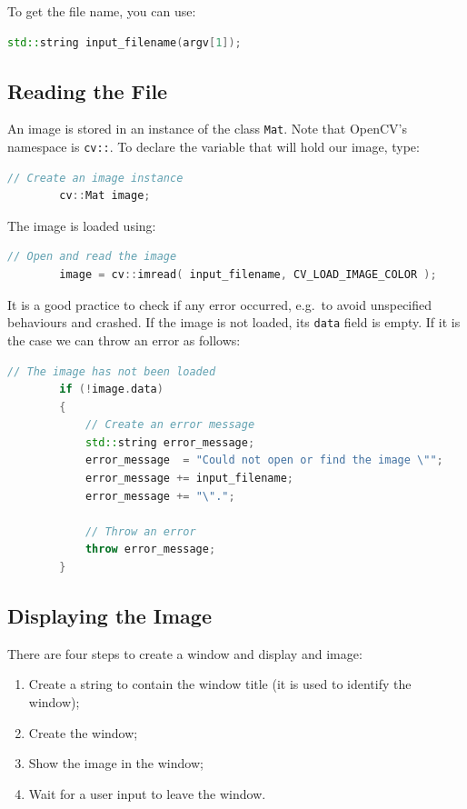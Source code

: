 \documentclass[english,a4paper,12pt,oneside]{article}
\begin{document}
To get the file name, you can use:
\begin{lstlisting}[language=c++,caption=Getting the file name from the command line arguments.]
std::string input_filename(argv[1]);
\end{lstlisting}

\subsection{Reading the File}

An image is stored in an instance of the class  \verb+Mat+. 
Note that OpenCV's namespace is \verb+cv::+. 
To declare the variable that will hold our image, type:
 \begin{lstlisting}[language=c++]
        // Create an image instance
        cv::Mat image;
\end{lstlisting}

The image is loaded using:
 \begin{lstlisting}[language=c++,caption=Open an image.]
        // Open and read the image
        image = cv::imread( input_filename, CV_LOAD_IMAGE_COLOR );
\end{lstlisting}

It is a good practice to check if any error occurred, e.g.~to avoid unspecified behaviours and crashed. 
If the image is not loaded, its \verb+data+ field is empty. 
If it is the case we can throw an error as follows:
 \begin{lstlisting}[language=c++,caption=Check that the image contains data]
        // The image has not been loaded
        if (!image.data)
        {
            // Create an error message
            std::string error_message;
            error_message  = "Could not open or find the image \"";
            error_message += input_filename;
            error_message += "\".";

            // Throw an error
            throw error_message;
        }
\end{lstlisting}


\subsection{Displaying the Image}

There are four steps to create a window and display and image:
\begin{enumerate}
 \item Create a string to contain the window title (it is used to identify the window);
 \item Create the window;
 \item Show the image in the window;
 \item Wait for a user input to leave the window.
\end{enumerate}
\end{document}
